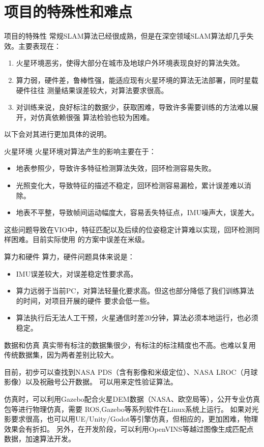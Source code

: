 \documentclass[10pt,aspectratio=169]{beamer}
\begin{document}
\section{项目的特殊性和难点}
\begin{frame}{项目的特殊性}
  常规SLAM算法已经很成熟，但是在深空领域SLAM算法却几乎失效。主要表现在：
  \begin{enumerate}
    \item 火星环境恶劣，使得大部分在城市及地球户外环境表现良好的算法失效。
    \item 算力弱，硬件差，鲁棒性强，能适应现有火星环境的算法无法部署，同时星载硬件往往
    测量结果误差较大，对算法要求很高。
    \item 对训练来说，良好标注的数据少，获取困难，导致许多需要训练的方法难以展开，对仿真依赖很强
    算法检验也较为困难。
  \end{enumerate}
  以下会对其进行更加具体的说明。
\end{frame}
\begin{frame}{火星环境}
  火星环境对算法产生的影响主要在于：
  \begin{itemize}
    \item 地表参照少，导致许多特征检测算法失效，回环检测容易失败。
    \item 光照变化大，导致特征的描述不稳定，回环检测容易漏检，累计误差难以消除。
    \item 地表不平整，导致帧间运动幅度大，容易丢失特征点，IMU噪声大，误差大。
  \end{itemize}
  这些问题导致在VIO中，特征匹配以及后续的位姿稳定计算难以实现，回环检测同样困难。目前实际使用
  的方案中误差在米级。
\end{frame}
\begin{frame}{算力和硬件}
  算力，硬件问题具体来说是：
  \begin{itemize}
    \item IMU误差较大，对误差稳定性要求高。
    \item 算力远弱于当前PC，对算法轻量化要求高。但这也部分降低了我们训练算法的时间，对项目开展的硬件
      要求会低一些。
    \item 算法执行后无法人工干预，火星通信时差20分钟，算法必须本地运行，也必须稳定。
  \end{itemize}
\end{frame}
\begin{frame}{数据和仿真}
  真实带有标注的数据集很少，有标注的标注精度也不高。也难以复用传统数据集，因为两者差别比较大。

  目前，初步可以查找到NASA PDS（含有影像和米级定位）、NASA LROC（月球影像）以及祝融号公开数据。
  可以用来定性验证算法。

  仿真时，可以利用Gazebo配合火星DEM数据（NASA、欧空局等），公开专业仿真包等进行物理仿真，需要
  ROS,Gazebo等系列软件在Linux系统上运行。
  如果对光影要求很高，也可以用UE/Unity/Godot等引擎仿真，但相应的，更加困难，物理效果会有折扣。
  另外，在开发阶段，可以利用OpenVINS等越过图像生成匹配点数据，加速算法开发。
\end{frame}
\end{document}
